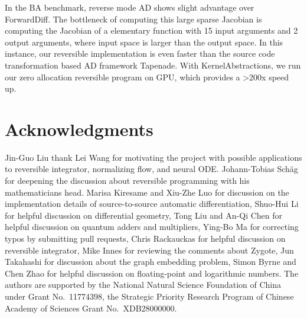 \documentclass{article}
\newcommand{\<}{\langle}
\renewcommand{\>}{\rangle}
\theoremstyle{definition}\newtheorem{definition}{\textit{Definition}}
\begin{document}
In the BA benchmark, reverse mode AD shows slight advantage over ForwardDiff.
The bottleneck of computing this large sparse Jacobian is computing the Jacobian of a elementary function with 15 input arguments and 2 output arguments, where input space is larger than the output space.
In this instance, our reversible implementation is even faster than the source code transformation based AD framework Tapenade.
With KernelAbstractions, we run our zero allocation reversible program on GPU, which provides a >200x speed up.

\section{Acknowledgments}
Jin-Guo Liu thank Lei Wang for motivating the project with possible applications to reversible integrator, normalizing flow, and neural ODE.
Johann-Tobias Schäg for deepening the discussion about reversible programming with his mathematicians head.
Marisa Kiresame and Xiu-Zhe Luo for discussion on the implementation details of source-to-source automatic differentiation,
Shuo-Hui Li for helpful discussion on differential geometry, Tong Liu and An-Qi Chen for helpful discussion on quantum adders and multipliers, Ying-Bo Ma for correcting typos by submitting pull requests, Chris Rackauckas for helpful discussion on reversible integrator, Mike Innes for reviewing the comments about Zygote, Jun Takahashi for discussion about the graph embedding problem, Simon Byrne and Chen Zhao for helpful discussion on floating-point and logarithmic numbers.
The authors are supported by the National Natural Science Foundation of China under Grant No.~11774398, the Strategic Priority Research Program of Chinese Academy of Sciences Grant No.~XDB28000000.



\end{document}
